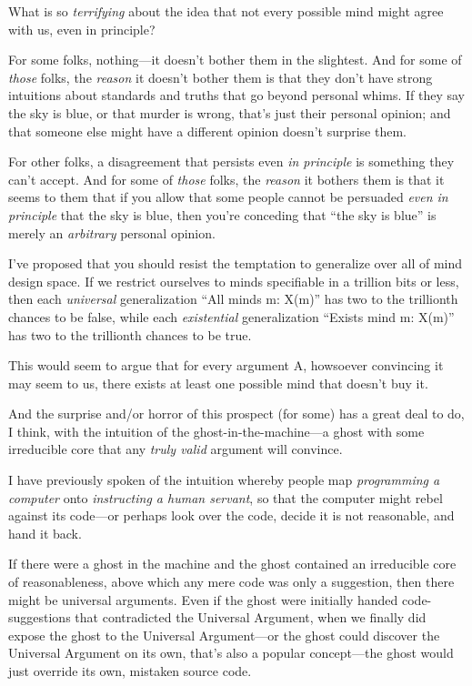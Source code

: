 
{
 What is so \textit{terrifying} about the idea that not every
possible mind might agree with us, even in principle? }

{
 For some folks, nothing---it doesn't bother them
in the slightest. And for some of \textit{those} folks, the
\textit{reason} it doesn't bother them is that they
don't have strong intuitions about standards and truths
that go beyond personal whims. If they say the sky is blue, or that
murder is wrong, that's just their personal opinion;
and that someone else might have a different opinion
doesn't surprise them.}

{
 For other folks, a disagreement that persists even \textit{in
principle} is something they can't accept. And for some
of \textit{those} folks, the \textit{reason} it bothers them is that it
seems to them that if you allow that some people cannot be persuaded
\textit{even in principle} that the sky is blue, then
you're conceding that ``the sky is
blue'' is merely an \textit{arbitrary} personal
opinion.}

{
 I've proposed that you should resist the
temptation to generalize over all of mind design space. If we restrict
ourselves to minds specifiable in a trillion bits or less, then each
\textit{universal} generalization ``All minds m:
X(m)'' has two to the trillionth chances to be false,
while each \textit{existential} generalization
``Exists mind m: X(m)'' has two to
the trillionth chances to be true.}

{
 This would seem to argue that for every argument A, howsoever
convincing it may seem to us, there exists at least one possible mind
that doesn't buy it.}

{
 And the surprise and/or horror of this prospect (for some) has a
great deal to do, I think, with the intuition of the
ghost-in-the-machine---a ghost with some irreducible core that any
\textit{truly valid} argument will convince.}

{
 I have previously spoken of the intuition whereby people map
\textit{programming a computer} onto \textit{instructing a human
servant}, so that the computer might rebel against its code---or
perhaps look over the code, decide it is not reasonable, and hand it
back.}

{
 If there were a ghost in the machine and the ghost contained an
irreducible core of reasonableness, above which any mere code was only
a suggestion, then there might be universal arguments. Even if the
ghost were initially handed code-suggestions that contradicted the
Universal Argument, when we finally did expose the ghost to the
Universal Argument---or the ghost could discover the Universal Argument
on its own, that's also a popular concept---the ghost
would just override its own, mistaken source code.}

